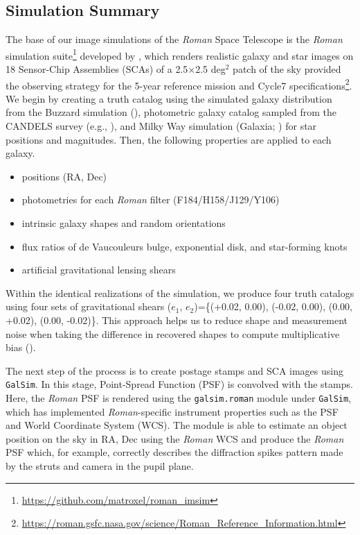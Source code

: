 \documentclass[fleqn,usenatbib]{mnras}
\begin{document}
\subsection{Simulation Summary}
\label{subsec:imsim}
The base of our image simulations of the \emph{Roman} Space Telescope is the \emph{Roman} simulation suite\footnote{\url{ https://github.com/matroxel/roman_imsim}} developed by \citet{2021MNRAS.501.2044T}, which renders realistic galaxy and star images on 18 Sensor-Chip Assemblies (SCAs) of a 2.5$\times$2.5 deg$^{2}$ patch of the sky provided the observing strategy for the 5-year reference mission and Cycle7 specifications\footnote{\url{https://roman.gsfc.nasa.gov/science/Roman_Reference_Information.html}}. We begin by creating a truth catalog using the simulated galaxy distribution from the Buzzard simulation (\citealt{2019arXiv190102401D}), photometric galaxy catalog sampled from the CANDELS survey (e.g., \citealt{2019ApJ...877..117H}), and Milky Way simulation (Galaxia; \citealt{2011ApJ...730....3S}) for star positions and magnitudes. Then, the following properties are applied to each galaxy.
\begin{itemize}
    \item positions (RA, Dec)
    \item photometries for each \emph{Roman} filter (F184/H158/J129/Y106)
    \item intrinsic galaxy shapes and random orientations
    \item flux ratios of de Vaucouleurs bulge, exponential disk, and star-forming knots
    \item artificial gravitational lensing shears
\end{itemize} 
Within the identical realizations of the simulation, we produce four truth catalogs using four sets of gravitational shears ($e_{1}$, $e_{2}$)=\{(+0.02, 0.00), (-0.02, 0.00), (0.00, +0.02), (0.00, -0.02)\}. This approach helps us to reduce shape and measurement noise when taking the difference in recovered shapes to compute multiplicative bias (\citealt{2019A&A...621A...2P}). 


The next step of the process is to create postage stamps and SCA images using \texttt{GalSim}. In this stage, Point-Spread Function (PSF) is convolved with the stamps. Here, the \emph{Roman} PSF is rendered using the \texttt{galsim.roman} module under \texttt{GalSim}, which has implemented \emph{Roman}-specific instrument properties such as the PSF and World Coordinate System (WCS). The module is able to estimate an object position on the sky in RA, Dec using the \emph{Roman} WCS and produce the \emph{Roman} PSF which, for example, correctly describes the diffraction spikes pattern made by the struts and camera in the pupil plane. 
\end{document}
